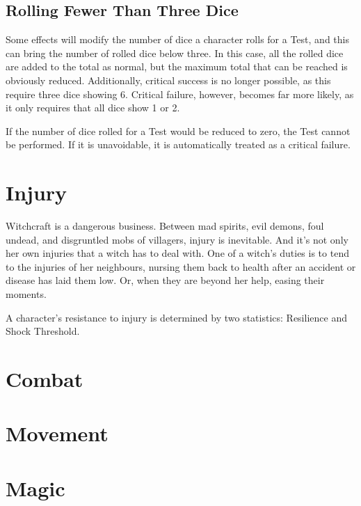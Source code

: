 \subsection{Rolling Fewer Than Three Dice}

Some effects will modify the number of dice a character rolls for a Test, and this can bring the number of rolled dice below three.
In this case, all the rolled dice are added to the total as normal, but the maximum total that can be reached is obviously reduced.
Additionally, critical success is no longer possible, as this require three dice showing 6.
Critical failure, however, becomes far more likely, as it only requires that all dice show 1 or 2.

If the number of dice rolled for a Test would be reduced to zero, the Test cannot be performed.
If it is unavoidable, it is automatically treated as a critical failure.

\section{Injury}

Witchcraft is a dangerous business.
Between mad spirits, evil demons, foul undead, and disgruntled mobs of villagers, injury is inevitable.
And it's not only her own injuries that a witch has to deal with.
One of a witch's duties is to tend to the injuries of her neighbours, nursing them back to health after an accident or disease has laid them low.
Or, when they are beyond her help, easing their moments.

A character's resistance to injury is determined by two statistics: Resilience and Shock Threshold.

\section{Combat}

\section{Movement}

\section{Magic}
